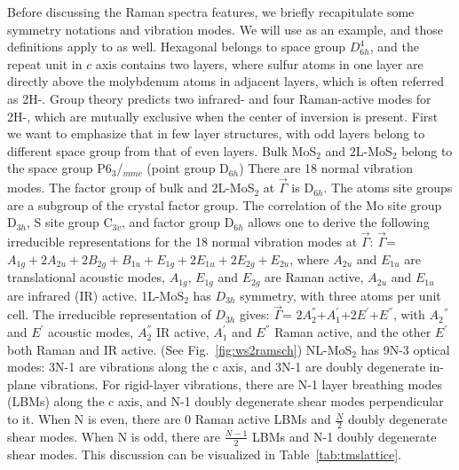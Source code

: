 Before discussing the Raman spectra features, we briefly recapitulate some symmetry notations and vibration modes. We will use  as an example, and those definitions apply to  as well. Hexagonal  belongs to space group $D_{6h}^4$, and the repeat unit in $c$ axis contains two layers, where sulfur atoms in one layer are directly above the molybdenum atoms in adjacent layers, which is often referred as 2H-. Group theory predicts two infrared- and four Raman-active modes for 2H-, which are mutually exclusive when the center of inversion is present. First we want to emphasize that in few layer structures,  with odd layers belong to different space group from that of even layers. Bulk MoS$_2$ and 2L-MoS$_2$ belong to the space group P6$_3$/$_{mmc}$ (point group D$_{6h}$) There are 18 normal vibration modes. The factor group of bulk and 2L-MoS$_2$ at $\vec{\Gamma}$ is D$_{6h}$. The atoms site groups are a subgroup of the crystal factor group. The correlation of the Mo site group D$_{3h}$, S site group C$_{3v}$, and factor group D$_{6h}$ allows one to derive the following irreducible representations for the 18 normal vibration modes at $\vec{\Gamma}$: $\vec{\Gamma}$= $A_{1g}+2A_{2u}+2B_{2g}+B_{1u}+E_{1g}+2E_{1u}+2E_{2g}+E_{2u}$, where $A_{2u}$ and $E_{1u}$ are translational acoustic modes, $A_{1g}$, $E_{1g}$ and $E_{2g}$ are Raman active, $A_{2u}$ and $E_{1u}$ are infrared (IR) active. 1L-MoS$_2$ has $D_{3h}$ symmetry, with three atoms per unit cell. The irreducible representation of $D_{3h}$ gives: $\vec{\Gamma}$= $2A_2^{''}$+$A_1^{'}$+$2E^{'}$+$E^{''}$, with $A_2$$^{''}$ and $E^{'}$ acoustic modes, $A_2^{''}$ IR active, $A_1^{'}$ and $E^{''}$ Raman active, and the other $E^{'}$ both Raman and IR active. (See Fig.~\ref{fig:ws2ramsch}) NL-MoS$_2$ has 9N-3 optical modes: 3N-1 are vibrations along the c axis, and 3N-1 are doubly degenerate in-plane vibrations. For rigid-layer vibrations, there are N-1 layer breathing modes (LBMs) along the c axis, and N-1 doubly degenerate shear modes perpendicular to it. When N is even, there are 0 Raman active LBMs and $\frac{N}{2}$ doubly degenerate shear modes. When N is odd, there are $\frac{N-1}{2}$ LBMs and N-1 doubly degenerate shear modes.\cite{Wieting1971,Zhang2013i} This discussion can be visualized in Table~\ref{tab:tmslattice}.

